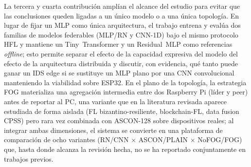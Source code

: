 La tercera y cuarta contribución amplían el alcance del estudio para evitar que las conclusiones queden ligadas a un único modelo o a una única topología. En lugar de fijar un MLP como única arquitectura, el trabajo entrena y evalúa dos familias de modelos federables (MLP/RN y CNN-1D) bajo el mismo protocolo HFL y mantiene un Tiny~Transformer y un Residual~MLP como referencias \emph{offline}; esto permite separar el efecto de la capacidad expresiva del modelo del efecto de la arquitectura distribuida y discutir, con evidencia, qué tanto puede ganar un IDS edge si se sustituye un MLP plano por una CNN convolucional manteniendo la viabilidad sobre ESP32. En el plano de la topología, la estrategia FOG materializa una agregación intermedia entre dos Raspberry Pi (líder y peer) antes de reportar al PC, una variante que en la literatura revisada aparece estudiada de forma aislada (FL bizantino-resiliente, blockchain-FL, data fusion CPSS) pero rara vez combinada con ASCON-128 sobre dispositivos reales; al integrar ambas dimensiones, el sistema se convierte en una plataforma de comparación de ocho variantes (RN/CNN $\times$ ASCON/PLAIN $\times$ NoFOG/FOG) que, hasta donde alcanza la revisión hecha, no se ha reportado conjuntamente en trabajos previos.

